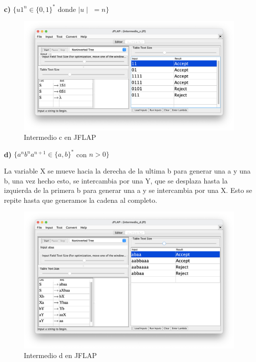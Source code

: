 \textbf{c)}  $\{ u1^{n} \in \{0,1\}^{\ast} $ donde $\mid u \mid$ $= n \}$

\begin{figure}[H] 
	\centering
	\includegraphics[scale=0.35]{../practica_1/images/intermedio_c.png} 
	\caption{Intermedio c en JFLAP} 
    \label{fig:intermedio_c}
\end{figure}

\textbf{d)}  $\{ a^{n} b^{n} a^{n+1} \in \{a,b\}^{\ast}$ con $n > 0\}$

La variable X se mueve hacia la derecha de la ultima b para generar una a y una b, una vez hecho esto, se intercambia por una Y, que se desplaza hasta la izquierda de la primera b para generar una a y se intercambia por una X. Esto se repite hasta que generamos la cadena al completo.

\begin{figure}[H] 
	\centering
	\includegraphics[scale=0.35]{../practica_1/images/intermedio_d.png} 
	\caption{Intermedio d en JFLAP} 
    \label{fig:intermedio_d}
\end{figure}


